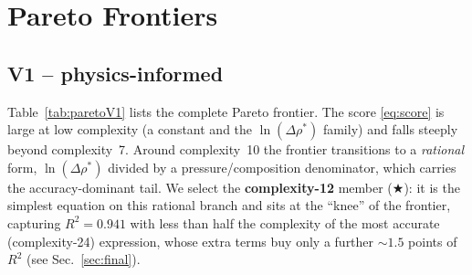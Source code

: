 \documentclass[11pt]{article}
\newcommand{\drhon}{\Delta\rho^{\!*}}
\begin{document}
\section{Pareto Frontiers}

\subsection{V1 -- physics-informed}

Table~\ref{tab:paretoV1} lists the complete Pareto frontier. The score
\eqref{eq:score} is large at low complexity (a constant and the
$\ln(\drhon)$ family) and falls steeply beyond complexity~7. Around
complexity~10 the frontier transitions to a \emph{rational} form,
$\ln(\drhon)$ divided by a pressure/composition denominator, which carries
the accuracy-dominant tail. We select the \textbf{complexity-12} member
($\bigstar$): it is the simplest equation on this rational branch and sits at
the ``knee'' of the frontier, capturing $R^2=0.941$ with less than half the
complexity of the most accurate (complexity-24) expression, whose extra
terms buy only a further $\sim\!1.5$ points of $R^2$ (see
Sec.~\ref{sec:final}).
\end{document}
